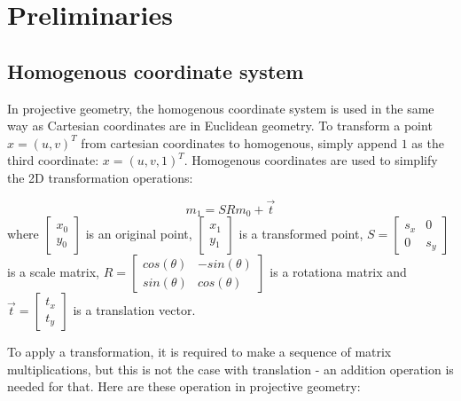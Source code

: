 \chapter{Preliminaries}

\label{chapter:epipilar_geo}
\section{Homogenous coordinate system}

In projective geometry, the homogenous coordinate system is used in the same way as Cartesian coordinates are in Euclidean geometry.
To transform a point $x=(u, v)^T$ from cartesian coordinates to homogenous, simply append $1$ as the third coordinate: $x=(u, v, 1)^T$.
Homogenous coordinates are used to simplify the 2D transformation operations: 


\begin{equation}
    m_1 = 
    S R
    m_0
    + \vec{t}
\end{equation}
where 
$\begin{bmatrix} x_0 \\ y_0 \end{bmatrix}$
is an original point,
$\begin{bmatrix} x_1 \\ y_1 \end{bmatrix}$
is a transformed point,
$S = \begin{bmatrix} s_x & 0 \\ 0 & s_y \end{bmatrix}$ 
is a scale matrix, 
$R = \begin{bmatrix} cos(\theta) & -sin(\theta) \\ sin(\theta) & cos(\theta) \end{bmatrix}$ 
is a rotationa matrix and 
$\vec{t} = \begin{bmatrix} t_x \\ t_y \end{bmatrix}$ 
is a translation vector.

To apply a transformation, it is required to make a sequence of matrix multiplications, but this is not the case with translation - an addition operation is needed for that. 
Here are these operation in projective geometry:

